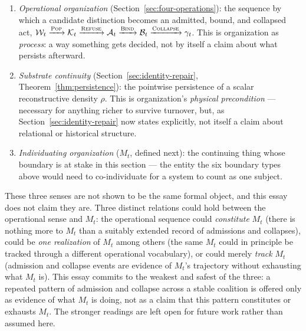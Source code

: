 \documentclass[11pt]{article}
\newcommand{\Pop}{\textsc{Pop}}
\newcommand{\Refuse}{\textsc{Refuse}}
\newcommand{\Bind}{\textsc{Bind}}
\newcommand{\Collapse}{\textsc{Collapse}}
\begin{document}
\begin{enumerate}
\item \emph{Operational organization} (Section~\ref{sec:four-operations}): the sequence by which a candidate distinction becomes an admitted, bound, and collapsed act, $\mathcal{W}_t\xrightarrow{\Pop}\mathcal{K}_t\xrightarrow{\Refuse}\mathcal{A}_t\xrightarrow{\Bind}\mathcal{B}_t\xrightarrow{\Collapse}\gamma_t$. This is organization as \emph{process}: a way something gets decided, not by itself a claim about what persists afterward.
\item \emph{Substrate continuity} (Section~\ref{sec:identity-repair}, Theorem~\ref{thm:persistence}): the pointwise persistence of a scalar reconstructive density $\rho$. This is organization's \emph{physical precondition} --- necessary for anything richer to survive turnover, but, as Section~\ref{sec:identity-repair} now states explicitly, not itself a claim about relational or historical structure.
\item \emph{Individuating organization} ($M_t$, defined next): the continuing thing whose boundary is at stake in this section --- the entity the six boundary types above would need to co-individuate for a system to count as one subject.
\end{enumerate}

These three senses are not shown to be the same formal object, and this essay does not claim they are. Three distinct relations could hold between the operational sense and $M_t$: the operational sequence could \emph{constitute} $M_t$ (there is nothing more to $M_t$ than a suitably extended record of admissions and collapses), could be \emph{one realization} of $M_t$ among others (the same $M_t$ could in principle be tracked through a different operational vocabulary), or could merely \emph{track} $M_t$ (admission and collapse events are evidence of $M_t$'s trajectory without exhausting what $M_t$ is). This essay commits to the weakest and safest of the three: a repeated pattern of admission and collapse across a stable coalition is offered only as evidence of what $M_t$ is doing, not as a claim that this pattern constitutes or exhausts $M_t$. The stronger readings are left open for future work rather than assumed here.
\end{document}
